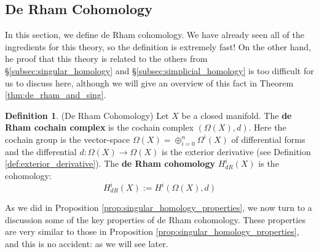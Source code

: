 \documentclass[12pt]{article}
\theoremstyle{definition}
\newtheorem{definition}[theorem]{Definition}
\numberwithin{equation}{section}
\begin{document}
\subsection{De Rham Cohomology} \label{subsec:de_rham_cohomology} In this section, we define de Rham cohomology. We have already seen all of the ingredients for this theory, so the definition is extremely fast! On the other hand, he proof that this theory is related to the others from \S \ref{subsec:singular_homology} and \S \ref{subsec:simplicial_homology} is too difficult for us to discuss here, although we will give an overview of this fact in Theorem \ref{thm:de_rham_and_sing}.

\begin{definition} \label{def:de_rham_cohomology} (De Rham Cohomology) Let $X$ be a closed manifold. The {\bf de Rham cochain complex} is the cochain complex $(\Omega(X),d)$. Here the cochain group is the vector-space $\Omega(X) = \oplus_{i=0}^n \Omega^i(X)$ of differential forms and the differential $d:\Omega(X) \to \Omega(X)$ is the exterior derivative (see Definition \ref{def:exterior_derivative}). The {\bf de Rham cohomology} $H^i_{dR}(X)$ is the cohomology:
\[
H^i_{dR}(X) := H^i(\Omega(X),d)
\]
\end{definition}

As we did in Proposition \ref{prop:singular_homology_properties}, we now turn to a discussion some of the key properties of de Rham cohomology. These properties are very similar to those in Proposition \ref{prop:singular_homology_properties}, and this is no accident: as we will see later. 
\end{document}
